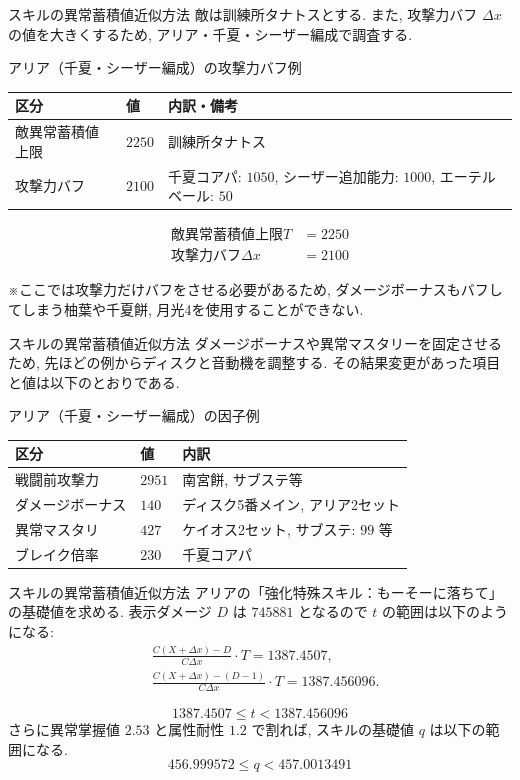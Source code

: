 \documentclass[aspectratio=169]{beamer}
\begin{document}
\begin{frame}{スキルの異常蓄積値近似方法}
敵は訓練所タナトスとする.
また, 攻撃力バフ $\Delta x$ の値を大きくするため, アリア・千夏・シーザー編成で調査する.
\begin{block}{アリア（千夏・シーザー編成）の攻撃力バフ例}
\small
\begin{tabularx}{\linewidth}{@{}l l X@{}}
区分 & 値 & 内訳・備考 \\
\midrule
敵異常蓄積値上限 & $2250$ & 訓練所タナトス \\
\midrule
攻撃力バフ & $2100$ & 千夏コアパ: $1050$, シーザー追加能力: $1000$, エーテルベール: $50$ \\
\midrule
\end{tabularx}
\vspace{0.4em}
\[
\begin{aligned}
  \text{敵異常蓄積値上限} T &= 2250\\
  \text{攻撃力バフ} \Delta x&= 2100
\end{aligned}
\]
\end{block}
※ここでは攻撃力だけバフをさせる必要があるため, ダメージボーナスもバフしてしまう柚葉や千夏餅, 月光4を使用することができない.
\end{frame}
\begin{frame}{スキルの異常蓄積値近似方法}
ダメージボーナスや異常マスタリーを固定させるため, 先ほどの例からディスクと音動機を調整する.
その結果変更があった項目と値は以下のとおりである.
\begin{block}{アリア（千夏・シーザー編成）の因子例}
\small
\begin{tabularx}{\linewidth}{@{}l l X@{}}
区分 & 値 & 内訳 \\
\midrule
戦闘前攻撃力 & $2951$ &南宮餅, サブステ等  \\
\midrule
ダメージボーナス & $140$ &ディスク5番メイン, アリア2セット  \\
\midrule
異常マスタリ & $427$ & ケイオス2セット, サブステ: $99$ 等 \\
\midrule
ブレイク倍率 & $230$ & 千夏コアパ  
\end{tabularx}
\end{block}
\end{frame}

\begin{frame}{スキルの異常蓄積値近似方法}
アリアの「強化特殊スキル：もーそーに落ちて」の基礎値を求める.
表示ダメージ $D$ は $745881$ となるので $t$ の範囲は以下のようになる:
\[
\begin{aligned}
&
\frac{
C(X+\Delta x)-D
}{
C\Delta x
}
\cdot T 
= 1387.4507,
\\[1.0em]
&
\frac{
C(X+\Delta x)-(D-1)
}{
C\Delta x
}
\cdot T 
= 1387.456096.
\end{aligned}
\]

\[
1387.4507
\le
t
<
1387.456096
\]
さらに異常掌握値 $2.53$ と属性耐性 $1.2$ で割れば, スキルの基礎値 $q$ は以下の範囲になる.
\[
456.999572
\le
q
<
457.0013491
\]
\end{frame}
\end{document}
